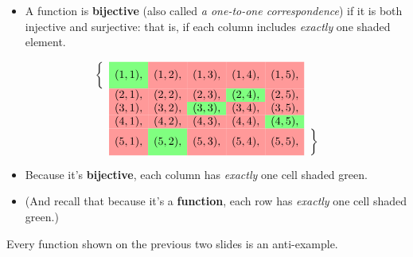 \documentclass[10pt]{beamer}
\begin{document}
\begin{frame}
\footnotesize 

\begin{myyellowbox}[title=Bijective]
\begin{itemize}
	\item A function is \textbf{bijective} (also called \textit{a one-to-one correspondence}) if it is both injective and surjective: that is, if each column includes \textit{exactly} one shaded element. 
\end{itemize}
\end{myyellowbox}

\vfill 
\begin{mygreenbox}[title=Example]
     \[
    \begin{array}{ccccccc}
        \bigg\{ &   \cellcolor{green!50} (1,1), & \cellcolor{red!40} (1,2), & \cellcolor{red!40} (1,3), & \cellcolor{red!40} (1,4), & \cellcolor{red!40} (1,5), &\\
         & \cellcolor{red!40} (2,1), & \cellcolor{red!40} (2,2), & \cellcolor{red!40} (2,3), & \cellcolor{green!50} (2,4), & \cellcolor{red!40} (2,5), &\\
        & \cellcolor{red!40} (3,1), & \cellcolor{red!40} (3,2), & \cellcolor{green!50} (3,3), & \cellcolor{red!40} (3,4), & \cellcolor{red!40} (3,5), &\\
        & \cellcolor{red!40} (4,1), & \cellcolor{red!40} (4,2), & \cellcolor{red!40} (4,3), & \cellcolor{red!40} (4,4), & \cellcolor{green!50} (4,5), & \\
        & \cellcolor{red!40} (5,1), & \cellcolor{green!50} (5,2), & \cellcolor{red!40} (5,3), & \cellcolor{red!40} (5,4), & \cellcolor{red!40} (5,5), & \bigg\} \\
    \end{array}
    \]
 \begin{itemize}
 \item Because it's \textbf{bijective}, each column has \textit{exactly} one cell shaded green.
 \item (And recall that because it's a \textbf{function}, each row has \textit{exactly} one cell shaded green.)
 \end{itemize}

\end{mygreenbox}

\vfill 
\begin{myredbox}[title=Anti-Examples]
Every function shown on the previous two slides is an anti-example.
\end{myredbox} 

\end{frame}
\end{document}
